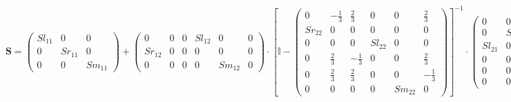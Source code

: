 \begin{equation} \mathbf{S} = \left(\begin{array}{ccc} Sl_{11} & 0 & 0
\\ 0 & Sr_{11} & 0 \\ 0 & 0 & Sm_{11} \end{array}\right) +
\left(\begin{array}{cccccc} 0 & 0 & 0 & Sl_{12} & 0 & 0 \\ Sr_{12} & 0
& 0 & 0 & 0 & 0 \\ 0 & 0 & 0 & 0 & Sm_{12} & 0 \end{array}\right)
\cdot \left[ \mathbb{I}  - \left(\begin{array}{cccccc} 0 &
-\frac{1}{3} & \frac{2}{3} & 0 & 0 & \frac{2}{3} \\ Sr_{22} & 0 & 0 &
0 & 0 & 0 \\ 0 & 0 & 0 & Sl_{22} & 0 & 0 \\ 0 & \frac{2}{3} &
-\frac{1}{3} & 0 & 0 & \frac{2}{3} \\ 0 & \frac{2}{3} & \frac{2}{3} &
0 & 0 & -\frac{1}{3} \\ 0 & 0 & 0 & 0 & Sm_{22} & 0 \end{array}\right)
\right]^{-1} \cdot\left(\begin{array}{ccc} 0 & 0 & 0 \\ 0 & Sr_{21} &
0 \\ Sl_{21} & 0 & 0 \\ 0 & 0 & 0 \\ 0 & 0 & 0 \\ 0 & 0 & Sm_{21}
\end{array}\right) \end{equation}
